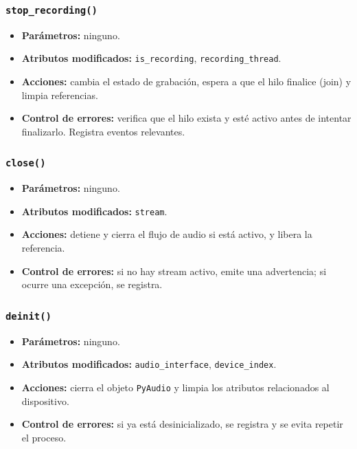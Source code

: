\subsubsection*{\texttt{stop\_recording()}}

\begin{itemize}
    \item \textbf{Parámetros:} ninguno.
    \item \textbf{Atributos modificados:} \texttt{is\_recording}, \texttt{recording\_thread}.
    \item \textbf{Acciones:} cambia el estado de grabación, espera a que el hilo finalice (join) y limpia referencias.
    \item \textbf{Control de errores:} verifica que el hilo exista y esté activo antes de intentar finalizarlo. Registra eventos relevantes.
\end{itemize}

\subsubsection*{\texttt{close()}}

\begin{itemize}
    \item \textbf{Parámetros:} ninguno.
    \item \textbf{Atributos modificados:} \texttt{stream}.
    \item \textbf{Acciones:} detiene y cierra el flujo de audio si está activo, y libera la referencia.
    \item \textbf{Control de errores:} si no hay stream activo, emite una advertencia; si ocurre una excepción, se registra.
\end{itemize}

\subsubsection*{\texttt{deinit()}}

\begin{itemize}
    \item \textbf{Parámetros:} ninguno.
    \item \textbf{Atributos modificados:} \texttt{audio\_interface}, \texttt{device\_index}.
    \item \textbf{Acciones:} cierra el objeto \texttt{PyAudio} y limpia los atributos relacionados al dispositivo.
    \item \textbf{Control de errores:} si ya está desinicializado, se registra y se evita repetir el proceso.
\end{itemize}





